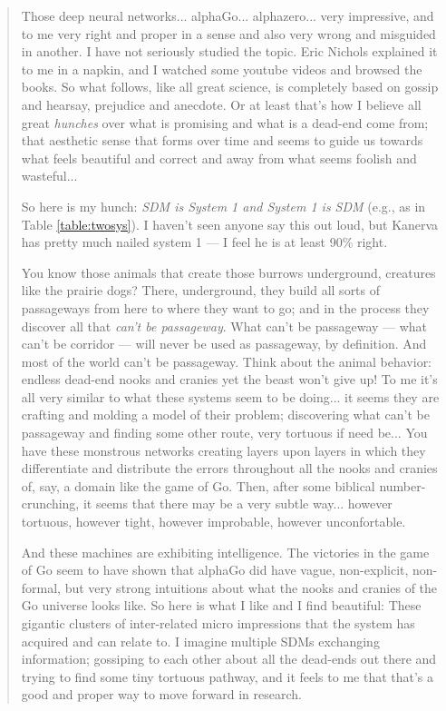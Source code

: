 \begin{quote}

    Those deep neural networks... alphaGo... alphazero... very impressive, and to me very right and proper in a sense and also very wrong and misguided in another. I have not seriously studied the topic. Eric Nichols explained it to me in a napkin, and I watched some youtube videos and browsed the books. So what follows, like all great science, is completely based on gossip and hearsay, prejudice and anecdote.  Or at least that's how I believe all great \emph{hunches} over what is promising and what is a dead-end come from; that aesthetic sense that forms over time and seems to guide us towards what feels beautiful and correct and away from what seems foolish and wasteful...

    So here is my hunch:  \emph{SDM is System 1 and System 1 is SDM} (e.g., as in Table \ref{table:twosys}). I haven't seen anyone say this out loud, but Kanerva has pretty much nailed system 1 --- I feel he is at least 90\% right.

    You know those animals that create those burrows underground, creatures like the prairie dogs?  There, underground, they build all sorts of passageways from here to where they want to go; and in the process they discover all that \emph{can't be passageway}.  What can't be passageway --- what can't be corridor --- will never be used as passageway, by definition.  And most of the world can't be passageway.  Think about the animal behavior: endless dead-end nooks and cranies yet the beast won't give up! To me it's all very similar to what these systems seem to be doing... it seems they are crafting and molding a model of their problem; discovering what can't be passageway and finding some other route, very tortuous if need be...  You have these monstrous networks creating layers upon layers in which they differentiate and distribute the errors throughout all the nooks and cranies of, say, a domain like the game of Go.  Then, after some biblical number-crunching, it seems that there may be a very subtle way... however tortuous, however tight, however improbable, however unconfortable.

    And these machines are exhibiting intelligence.  The victories in the game of Go seem to have shown that alphaGo did have vague, non-explicit, non-formal, but very strong intuitions about what the nooks and cranies of the Go universe looks like.  So here is what I like and I find beautiful:  These gigantic clusters of inter-related micro impressions that the system has acquired and can relate to.  I imagine multiple SDMs exchanging information; gossiping to each other about all the dead-ends out there and trying to find some tiny tortuous pathway, and it feels to me that that's a good and proper way to move forward in research.


\end{quote}
